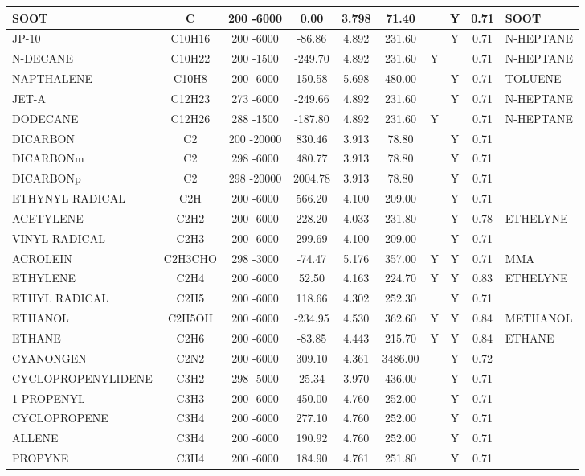 \begin{longtable}{@{\extracolsep{\fill}}|l|c|c|c|c|c|c|c|c|l|}
SOOT&C&200 -6000&    0.00& 3.798&    71.40& &Y& 0.71&SOOT\\ \hline
JP-10&C10H16&200 -6000&  -86.86& 4.892&   231.60& &Y& 0.71&N-HEPTANE\\ \hline
N-DECANE&C10H22&200 -1500& -249.70& 4.892&   231.60&Y& & 0.71&N-HEPTANE\\ \hline
NAPTHALENE&C10H8&200 -6000&  150.58& 5.698&   480.00& &Y& 0.71&TOLUENE\\ \hline
JET-A&C12H23&273 -6000& -249.66& 4.892&   231.60& &Y& 0.71&N-HEPTANE\\ \hline
DODECANE&C12H26&288 -1500& -187.80& 4.892&   231.60&Y& & 0.71&N-HEPTANE\\ \hline
DICARBON&C2&200 -20000&  830.46& 3.913&    78.80& &Y& 0.71&\\ \hline
DICARBONm&C2&298 -6000&  480.77& 3.913&    78.80& &Y& 0.71&\\ \hline
DICARBONp&C2&298 -20000& 2004.78& 3.913&    78.80& &Y& 0.71&\\ \hline
ETHYNYL RADICAL&C2H&200 -6000&  566.20& 4.100&   209.00& &Y& 0.71&\\ \hline
ACETYLENE&C2H2&200 -6000&  228.20& 4.033&   231.80& &Y& 0.78&ETHELYNE\\ \hline
VINYL RADICAL&C2H3&200 -6000&  299.69& 4.100&   209.00& &Y& 0.71&\\ \hline
ACROLEIN&C2H3CHO&298 -3000&  -74.47& 5.176&   357.00&Y&Y& 0.71&MMA\\ \hline
ETHYLENE&C2H4&200 -6000&   52.50& 4.163&   224.70&Y&Y& 0.83&ETHELYNE\\ \hline
ETHYL RADICAL&C2H5&200 -6000&  118.66& 4.302&   252.30& &Y& 0.71&\\ \hline
ETHANOL&C2H5OH&200 -6000& -234.95& 4.530&   362.60&Y&Y& 0.84&METHANOL\\ \hline
ETHANE&C2H6&200 -6000&  -83.85& 4.443&   215.70&Y&Y& 0.84&ETHANE\\ \hline
CYANONGEN&C2N2&200 -6000&  309.10& 4.361&  3486.00& &Y& 0.72&\\ \hline
CYCLOPROPENYLIDENE&C3H2&298 -5000&   25.34& 3.970&   436.00& &Y& 0.71&\\ \hline
1-PROPENYL&C3H3&200 -6000&  450.00& 4.760&   252.00& &Y& 0.71&\\ \hline
CYCLOPROPENE&C3H4&200 -6000&  277.10& 4.760&   252.00& &Y& 0.71&\\ \hline
ALLENE&C3H4&200 -6000&  190.92& 4.760&   252.00& &Y& 0.71&\\ \hline
PROPYNE&C3H4&200 -6000&  184.90& 4.761&   251.80& &Y& 0.71&\\ \hline

\end{longtable}
